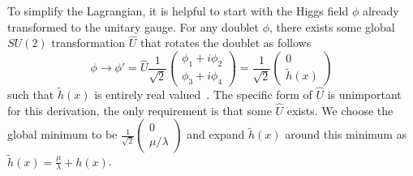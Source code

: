 To simplify the Lagrangian, it is helpful to start with the Higgs field $\phi$ already transformed to the unitary gauge. For any doublet $\phi$, there exists some global $SU(2)$ transformation $\hat{U}$ that rotates the doublet as follows
\begin{equation}
	\phi\to\phi'=\hat{U}\frac{1}{\sqrt{2}}\begin{pmatrix}\phi_1+i\phi_2\\\phi_3+i\phi_4\end{pmatrix}=\frac{1}{\sqrt{2}}\begin{pmatrix}0\\\tilde{h}(x)\end{pmatrix}
\end{equation}
such that $\tilde{h}(x)$ is entirely real valued~\cite{mandl2010quantum}. The specific form of $\hat{U}$ is unimportant for this derivation, the only requirement is that some $\hat{U}$ exists. We choose the global minimum to be $\frac{1}{\sqrt{2}}\begin{pmatrix}0\\\mu/\lambda\end{pmatrix}$ and expand $\tilde{h}(x)$ around this minimum as $\tilde{h}(x)=\frac{\mu}{\lambda}+h(x)$.

